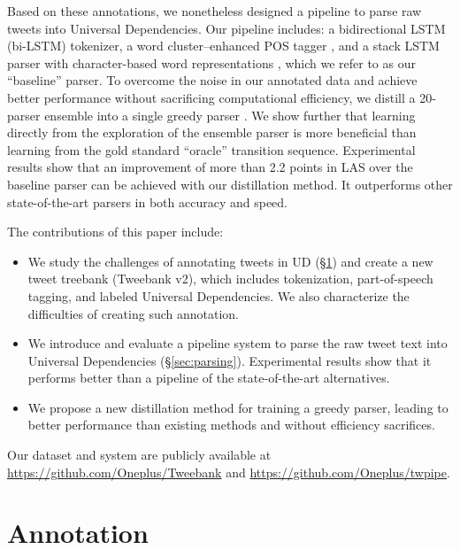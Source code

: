 \documentclass[11pt,a4paper]{article}
\begin{document}
Based on these annotations, we nonetheless designed a pipeline to parse 
raw tweets into Universal Dependencies. Our pipeline includes: a
bidirectional LSTM (bi-LSTM) tokenizer, a word cluster--enhanced POS
tagger \citep[following][]{owoputi-EtAl:2013:NAACL-HLT}, and a stack LSTM parser
with character-based word representations
\cite{ballesteros-dyer-smith:2015:EMNLP}, which we refer to as our
``baseline'' parser.
To overcome the noise in our annotated data and achieve better performance
without sacrificing computational efficiency, we 
distill a 20-parser ensemble into a single greedy  parser 
\cite{DBLP:journals/corr/HintonVD15}.
We show further  that learning directly from the exploration of the ensemble parser
is more beneficial than learning from the gold standard ``oracle''
transition sequence. Experimental results show that an improvement of more
than 2.2 points in LAS over the
baseline parser can be achieved with our distillation method.  It outperforms
other state-of-the-art parsers in both accuracy and speed.

The contributions of this paper include:
\begin{itemize}
\item We study the challenges of annotating tweets in UD (\S\ref{sec:anno})
and create a new tweet treebank ({\sc Tweebank v2}), which includes 
tokenization, part-of-speech tagging, and labeled Universal Dependencies.
We also characterize the difficulties of creating such annotation.

\item We introduce and evaluate a pipeline system to parse the raw tweet text into
Universal Dependencies (\S\ref{sec:parsing}).  Experimental results show
that it performs better than a pipeline of the state-of-the-art alternatives.

\item We propose a new distillation
method for training a greedy parser, leading to better performance
than existing methods and without efficiency sacrifices.
\end{itemize}

Our dataset and system are publicly available at \url{https://github.com/Oneplus/Tweebank}
and \url{https://github.com/Oneplus/twpipe}.


\section{Annotation}\label{sec:anno}
\end{document}
